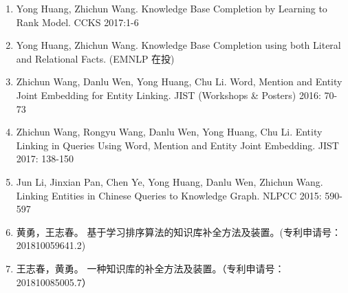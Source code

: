 \begin{paper}
\begin{enumerate}
  \item Yong Huang, Zhichun Wang. Knowledge Base Completion by Learning to Rank Model. CCKS 2017:1-6
  \item Yong Huang, Zhichun Wang. Knowledge Base Completion using both Literal and Relational Facts. (EMNLP 在投)
  \item Zhichun Wang, Danlu Wen, Yong Huang, Chu Li.
Word, Mention and Entity Joint Embedding for Entity Linking. JIST (Workshops & Posters) 2016: 70-73
 \item Zhichun Wang, Rongyu Wang, Danlu Wen, Yong Huang, Chu Li.
Entity Linking in Queries Using Word, Mention and Entity Joint Embedding. JIST 2017: 138-150
  \item Jun Li, Jinxian Pan, Chen Ye, Yong Huang, Danlu Wen, Zhichun Wang. 
  Linking Entities in Chinese Queries to Knowledge Graph. NLPCC 2015: 590-597
  \item 黄勇，王志春。 基于学习排序算法的知识库补全方法及装置。(专利申请号：201810059641.2)
  \item 王志春，黄勇。 一种知识库的补全方法及装置。（专利申请号：201810085005.7）
  \end{enumerate}
\end{paper}
